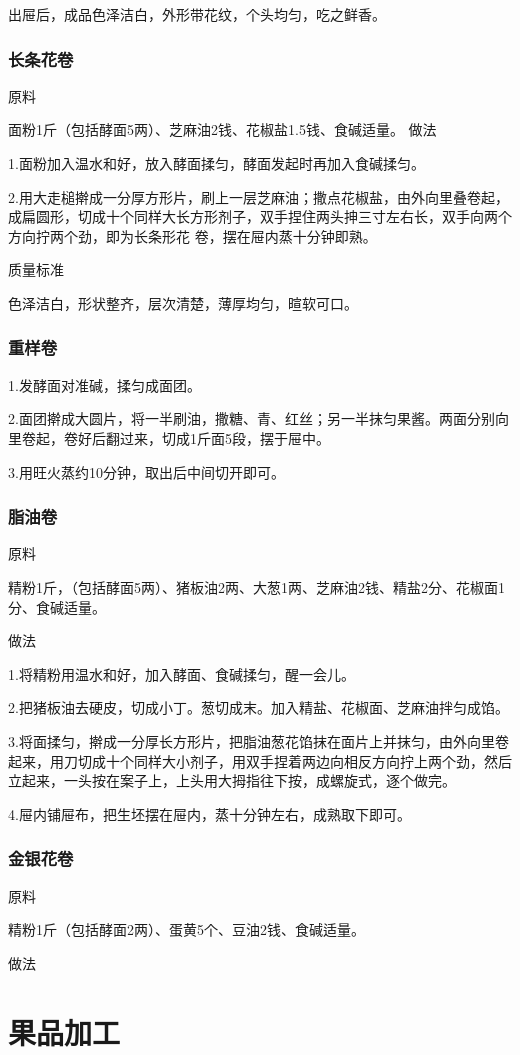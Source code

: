 \documentclass{ctexbook}
\begin{document}
出屉后，成品色泽洁白，外形带花纹，个头均匀，吃之鲜香。
\subsection{长条花卷}
原料

面粉1斤（包括酵面5两）、芝麻油2钱、花椒盐1.5钱、食碱适量。
做法

1.面粉加入温水和好，放入酵面揉匀，酵面发起时再加入食碱揉匀。

2.用大走槌擀成一分厚方形片，刷上一层芝麻油；撒点花椒盐，由外向里叠卷起，成扁圆形，切成十个同样大长方形剂子，双手捏住两头抻三寸左右长，双手向两个方向拧两个劲，即为长条形花 卷，摆在屉内蒸十分钟即熟。

质量标准

色泽洁白，形状整齐，层次清楚，薄厚均匀，暄软可口。
\subsection{重样卷}
1.发酵面对准碱，揉匀成面团。

2.面团擀成大圆片，将一半刷油，撒糖、青、红丝；另一半抹匀果酱。两面分别向里卷起，卷好后翻过来，切成1斤面5段，摆于屉中。

3.用旺火蒸约10分钟，取出后中间切开即可。
\subsection{脂油卷}
原料

精粉1斤，（包括酵面5两）、猪板油2两、大葱1两、芝麻油2钱、精盐2分、花椒面1分、食碱适量。

做法

1.将精粉用温水和好，加入酵面、食碱揉匀，醒一会儿。

2.把猪板油去硬皮，切成小丁。葱切成末。加入精盐、花椒面、芝麻油拌匀成馅。

3.将面揉匀，擀成一分厚长方形片，把脂油葱花馅抹在面片上并抹匀，由外向里卷起来，用刀切成十个同样大小剂子，用双手捏着两边向相反方向拧上两个劲，然后立起来，一头按在案子上，上头用大拇指往下按，成螺旋式，逐个做完。

4.屉内铺屉布，把生坯摆在屉内，蒸十分钟左右，成熟取下即可。
\subsection{金银花卷}
原料

精粉1斤（包括酵面2两）、蛋黄5个、豆油2钱、食碱适量。

做法


\chapter{果品加工}
\end{document}
